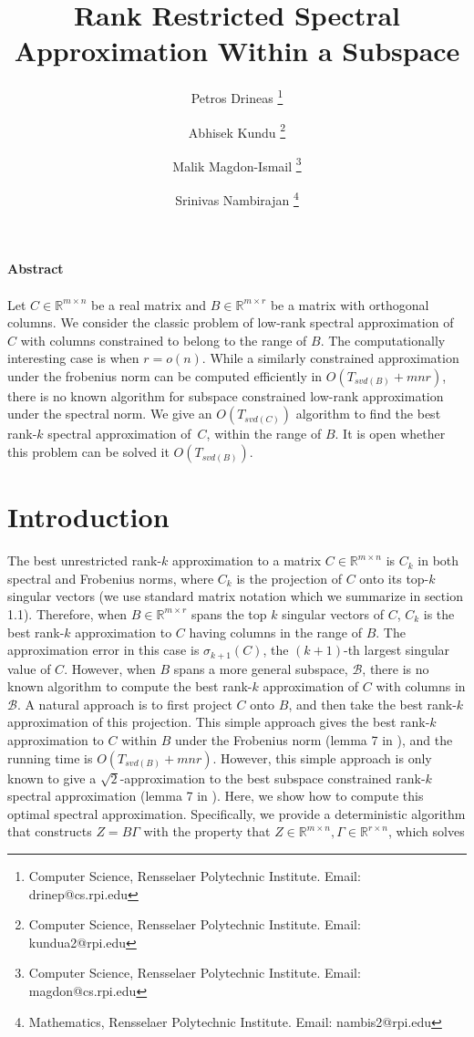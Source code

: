 \documentclass[11pt]{article}
\title{Rank Restricted Spectral Approximation  Within a Subspace \\ }
\author {Petros Drineas \footnote{Computer Science, Rensselaer Polytechnic Institute. Email: drinep@cs.rpi.edu} \\
\and
Abhisek Kundu \footnote{Computer Science, Rensselaer Polytechnic Institute. Email: kundua2@rpi.edu} \\
\and
Malik Magdon-Ismail \footnote{Computer Science, Rensselaer Polytechnic Institute. Email: magdon@cs.rpi.edu} \\
\and
Srinivas Nambirajan \footnote{Mathematics, Rensselaer Polytechnic Institute. Email: nambis2@rpi.edu} \\
\date{}
}
\def\reals{\mathbb{R}}
\newcommand{\B}{\mathcal{B}}
\newcommand{\G}{\Gamma}
\newcommand{\0}{\ensuremath{\mathbf{0}}}
\renewcommand{\>}{\succ}
\newcommand{\<}{\prec}
\begin{document}
         
\maketitle
\noindent \textbf{\small Abstract}
\\
\\ 
Let $C \in \reals^{m \times n}$ be a real matrix and $B \in \reals^{m \times r}$ be a matrix with orthogonal columns.
We consider the classic problem of low-rank spectral approximation of $C$ with columns constrained to belong to the range of $B$. The computationally interesting case is when $r = o(n)$. While a similarly constrained approximation under the frobenius norm can be computed efficiently in $O(T_{svd(B)}+ mnr)$, there is no known algorithm for subspace constrained low-rank approximation under the spectral norm. We give an $O(T_{svd(C)})$ algorithm to find the best rank-$k$ spectral approximation of~$C$, within the range of $B$. It is open whether this problem can be solved it $O(T_{svd(B)})$.

\section{Introduction}
The best unrestricted rank-$k$ approximation to a matrix $C \in \reals^{m \times n}$ is $C_k$ in both spectral and Frobenius norms, where $C_k$ is the projection of $C$ onto its top-$k$ singular vectors (we use standard matrix notation which we summarize in section 1.1). Therefore, when $B \in \reals^{m \times r}$ spans the top $k$ singular vectors of $C$, $C_k$ is the best rank-$k$ approximation to $C$ having columns in the range of $B$. The approximation error in this case is $\sigma_{k+1}(C)$, the $(k+1)$-th largest singular value of $C$. 
However, when $B$ spans a more general subspace, $\B$, there is no known algorithm to compute the best rank-$k$ approximation of $C$ with columns in $\B$. A natural approach is to first project $C$ onto $B$, and then take the best rank-$k$ approximation of this projection. This simple approach gives the best rank-$k$ approximation to $C$ within $B$ under the Frobenius norm (lemma 7 in \cite{BDM}), and the running time is $O(T_{svd(B)}+ mnr)$.  However, this simple approach is only 
known to give a $\sqrt{2}$-approximation to the best subspace constrained rank-$k$ spectral approximation (lemma 7 in \cite{BDM}). 
Here, we show how to compute this optimal spectral approximation. Specifically, we provide a deterministic algorithm that constructs $Z = B \G$ with the property that $Z \in \reals^{m \times n}, \G \in \reals^{r \times n}$, which solves
\end{document}
